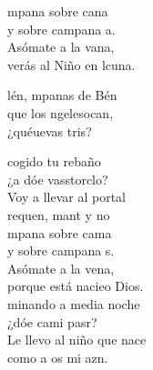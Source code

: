 \documentclass[12pt]{article}
\begin{document}
\begin{multicols*}{2}
\begin{cancion}%
	mpana sobre cana\\
	y sobre campana a.\\
	Asómate a la vana,\\
	verás al Niño en lcuna.\\
	\begin{chorus}%
	lén, mpanas de Bén\\
	que los ngelesocan,\\
	¿quéuevas tris?  \\
	\end{chorus}%
	cogido tu rebaño\\
	¿a dóe vasstorclo? \\
Voy a llevar al portal\\
	requen, mant y no \\
	mpana sobre cama\\
	y sobre campana s.\\
	Asómate a la vena,\\
	porque está nacieo Dios.\\
	minando a media noche\\
	¿dóe cami pasr? \\
	Le llevo al niño que nace\\
	como a os mi azn.\\
\end{cancion}%


\end{multicols*}
\end{document}
